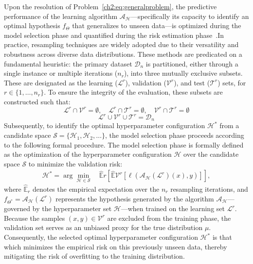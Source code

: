 Upon the resolution of Problem~\eqref{ch2:eq:generalproblem}, the predictive performance of the learning algorithm $\mathscr{A}_\mathcal{H}$—specifically its capacity to identify an optimal hypothesis $f_\Theta$ that generalizes to unseen data—is optimized during the model selection phase and quantified during the risk estimation phase~\citep{OnetoB003}.In practice, resampling techniques are widely adopted due to their versatility and robustness across diverse data distributions. 
These methods are predicated on a fundamental heuristic: the primary dataset $\mathcal{D}_n$ is partitioned, either through a single instance or multiple iterations ($n_r$), into three mutually exclusive subsets. 
These are designated as the learning ($\mathcal{L}^r$), validation ($\mathcal{V}^r$), and test ($\mathcal{T}^r$) sets, for $r \in \{ 1, \dots, n_r \}$. To ensure the integrity of the evaluation, these subsets are constructed such that:$$ \mathcal{L}^r \cap \mathcal{V}^r = \emptyset, \quad \mathcal{L}^r \cap \mathcal{T}^r = \emptyset, \quad \mathcal{V}^r \cap \mathcal{T}^r = \emptyset $$$$ \mathcal{L}^r \cup \mathcal{V}^r \cup \mathcal{T}^r = \mathcal{D}_n $$Subsequently, to identify the optimal hyperparameter configuration $\mathcal{H}^*$ from a candidate space $\mathcal{S} = \{ \mathcal{H}_1, \mathcal{H}_2, \dots \}$, the model selection phase proceeds according to the following formal procedure.
%
The model selection phase is formally defined as the optimization of the hyperparameter configuration $\mathcal{H}$ over the candidate space $\mathcal{S}$ to minimize the validation risk:\begin{align}\label{ch2:eq:MS}\mathcal{H}^* = \arg\min_{\mathcal{H} \in \mathcal{S}} \quad\hat{\mathbb{E}}r \left[ \hat{\mathbb{E}}{\mathcal{V}^r} \left[ \ell(\mathscr{A}_{\mathcal{H}}(\mathcal{L}^r)(x), y) \right] \right],\end{align}where $\hat{\mathbb{E}}_r$ denotes the empirical expectation over the $n_r$ resampling iterations, and $f_{\Theta^*} = \mathscr{A}_{\mathcal{H}}(\mathcal{L}^r)$ represents the hypothesis generated by the algorithm $\mathscr{A}_\mathcal{H}$—governed by the hyperparameter set $\mathcal{H}$—when trained on the learning set $\mathcal{L}^r$.
Because the samples $(x, y) \in \mathcal{V}^r$ are excluded from the training phase, the validation set serves as an unbiased proxy for the true distribution $\mu$. 
Consequently, the selected optimal hyperparameter configuration $\mathcal{H}^*$ is that which minimizes the empirical risk on this previously unseen data, thereby mitigating the risk of overfitting to the training distribution.
